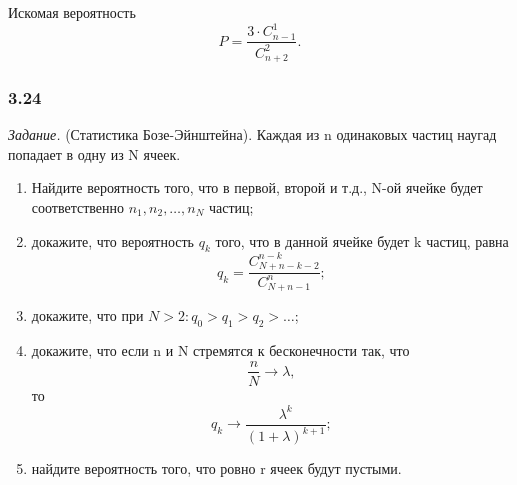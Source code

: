Искомая вероятность
$$ P =
\frac{ 3 \cdot C_{n-1}^1 }{ C_{n+2}^{2} }.$$

\subsubsection*{3.24}

\textit{Задание.} (Статистика Бозе-Эйнштейна).
Каждая из n одинаковых частиц наугад попадает в одну из N ячеек.
\begin{enumerate}[label=\alph*)]
\item Найдите вероятность того, что в первой, второй и т.д., N-ой ячейке будет соответственно $ n_1, n_2, \dotsc , n_N $ частиц;
\item докажите, что вероятность $ q_k $ того, что в данной ячейке будет k частиц, равна
$$ q_k =
\frac{ C_{ N+n-k-2 }^{ n-k } }{ C_{ N+n-1 }^n };$$
\item докажите, что при $ N > 2 : q_0 > q_1 > q_2 > \dotsc $;
\item докажите, что если n и N стремятся к бесконечности так, что
$$ \frac{ n }{ N } \rightarrow \lambda,$$
то
$$ q_k \rightarrow \frac{ \lambda^k }{ \left( 1 + \lambda \right)^{ k+1 } };$$
\item найдите вероятность того, что ровно r ячеек будут пустыми.
\end{enumerate}

